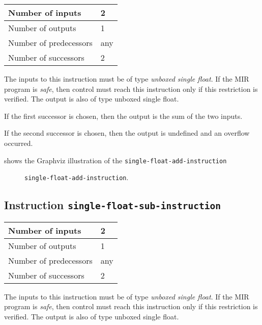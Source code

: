 \begin{tabular}{|l|l|}
\hline
Number of inputs & 2\\
\hline
Number of outputs & 1\\
\hline
Number of predecessors & any\\
\hline
Number of successors & 2\\
\hline
\end{tabular}

The inputs to this instruction must be of type \emph{unboxed single
  float}.  If the MIR program is \emph{safe}, then control must reach
this instruction only if this restriction is verified.  The output is
also of type unboxed single float.

If the first successor is chosen, then the output is
the sum of the two inputs.  

If the second successor is chosen, then the output is undefined and an
overflow occurred. 

 shows the Graphviz illustration of the
\texttt{single-float-add-instruction}

\begin{figure}
\begin{center}
\end{center}
\caption{\label{fig-single-float-add-instruction}
\texttt{single-float-add-instruction}.}
\end{figure}

\subsection{Instruction \texttt{single-float-sub-instruction}}
\label{mir-instruction-single-float-sub}

\begin{tabular}{|l|l|}
\hline
Number of inputs & 2\\
\hline
Number of outputs & 1\\
\hline
Number of predecessors & any\\
\hline
Number of successors & 2\\
\hline
\end{tabular}

The inputs to this instruction must be of type \emph{unboxed single
  float}.  If the MIR program is \emph{safe}, then control must reach
this instruction only if this restriction is verified.  The output is
also of type unboxed single float.

